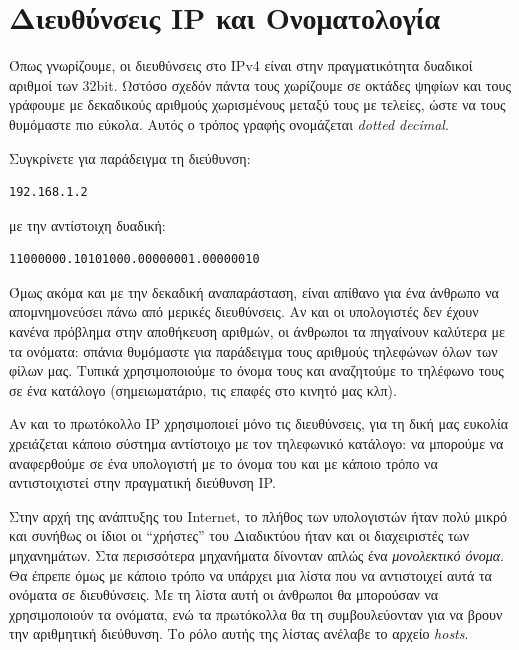 %
%
\section{Διευθύνσεις IP και Ονοματολογία}
\label{sec:sec34}

Όπως γνωρίζουμε, οι διευθύνσεις στο IPv4 είναι στην πραγματικότητα δυαδικοί αριθμοί των 32bit.  Ωστόσο σχεδόν πάντα τους χωρίζουμε σε οκτάδες ψηφίων και τους γράφουμε με δεκαδικούς αριθμούς χωρισμένους μεταξύ τους με τελείες, ώστε να τους θυμόμαστε πιο εύκολα. Αυτός ο τρόπος γραφής ονομάζεται \emph{dotted decimal}.

Συγκρίνετε για παράδειγμα τη διεύθυνση:

\begin{center}
\begin{verbatim}
192.168.1.2
\end{verbatim}
\end{center}

με την αντίστοιχη δυαδική:

\begin{center}
\begin{verbatim}
‭11000000‬.‭10101000‬.00000001.00000010
\end{verbatim}
\end{center}

Όμως ακόμα και με την δεκαδική αναπαράσταση, είναι απίθανο για ένα άνθρωπο να απομνημονεύσει πάνω από μερικές διευθύνσεις. Αν και οι υπολογιστές δεν έχουν κανένα πρόβλημα στην αποθήκευση αριθμών, οι άνθρωποι τα πηγαίνουν καλύτερα με τα ονόματα: σπάνια θυμόμαστε για παράδειγμα τους αριθμούς τηλεφώνων όλων των φίλων μας. Τυπικά χρησιμοποιούμε το όνομα τους και αναζητούμε το τηλέφωνο τους σε ένα κατάλογο (σημειωματάριο, τις επαφές στο κινητό μας κλπ). 

Αν και το πρωτόκολλο IP χρησιμοποιεί μόνο τις διευθύνσεις, για τη δική μας ευκολία χρειάζεται κάποιο σύστημα αντίστοιχο με τον τηλεφωνικό κατάλογο: να μπορούμε να αναφερθούμε σε ένα υπολογιστή με το όνομα του και με κάποιο τρόπο να αντιστοιχιστεί στην πραγματική διεύθυνση IP.

Στην αρχή της ανάπτυξης του Internet, το πλήθος των υπολογιστών ήταν πολύ μικρό και συνήθως οι ίδιοι οι ``χρήστες'' του Διαδικτύου ήταν και οι διαχειριστές των μηχανημάτων. Στα περισσότερα μηχανήματα δίνονταν απλώς ένα \emph{μονολεκτικό όνομα}. Θα έπρεπε όμως με κάποιο τρόπο να υπάρχει μια λίστα που να αντιστοιχεί αυτά τα ονόματα σε διευθύνσεις. Με τη λίστα αυτή οι άνθρωποι θα μπορούσαν να χρησιμοποιούν τα ονόματα, ενώ τα πρωτόκολλα θα τη συμβουλεύονταν για να βρουν την αριθμητική διεύθυνση. Το ρόλο αυτής της λίστας ανέλαβε το αρχείο \emph{hosts}.

